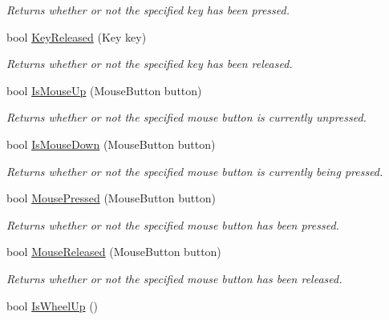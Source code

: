 \begin{DoxyCompactItemize}
\begin{DoxyCompactList}\small\item\em Returns whether or not the specified key has been pressed. \end{DoxyCompactList}\item 
bool \hyperlink{class_tri_devs_1_1_tri_engine_1_1_input_1_1_input_manager_a8d266621120e079689cef8952a896bb9}{Key\-Released} (Key key)
\begin{DoxyCompactList}\small\item\em Returns whether or not the specified key has been released. \end{DoxyCompactList}\item 
bool \hyperlink{class_tri_devs_1_1_tri_engine_1_1_input_1_1_input_manager_ad069c11571596d4203dfa2362132cfe9}{Is\-Mouse\-Up} (Mouse\-Button button)
\begin{DoxyCompactList}\small\item\em Returns whether or not the specified mouse button is currently unpressed. \end{DoxyCompactList}\item 
bool \hyperlink{class_tri_devs_1_1_tri_engine_1_1_input_1_1_input_manager_a41c750b252a55460dd7b17f598e17519}{Is\-Mouse\-Down} (Mouse\-Button button)
\begin{DoxyCompactList}\small\item\em Returns whether or not the specified mouse button is currently being pressed. \end{DoxyCompactList}\item 
bool \hyperlink{class_tri_devs_1_1_tri_engine_1_1_input_1_1_input_manager_a97d0173d6ff046596ff4760573932aff}{Mouse\-Pressed} (Mouse\-Button button)
\begin{DoxyCompactList}\small\item\em Returns whether or not the specified mouse button has been pressed. \end{DoxyCompactList}\item 
bool \hyperlink{class_tri_devs_1_1_tri_engine_1_1_input_1_1_input_manager_a6c1a1a31c22c1c9dedc052a75392b5c4}{Mouse\-Released} (Mouse\-Button button)
\begin{DoxyCompactList}\small\item\em Returns whether or not the specified mouse button has been released. \end{DoxyCompactList}\item 
bool \hyperlink{class_tri_devs_1_1_tri_engine_1_1_input_1_1_input_manager_a3a3930c5db2724910007832d64363e39}{Is\-Wheel\-Up} ()

\end{DoxyCompactItemize}
